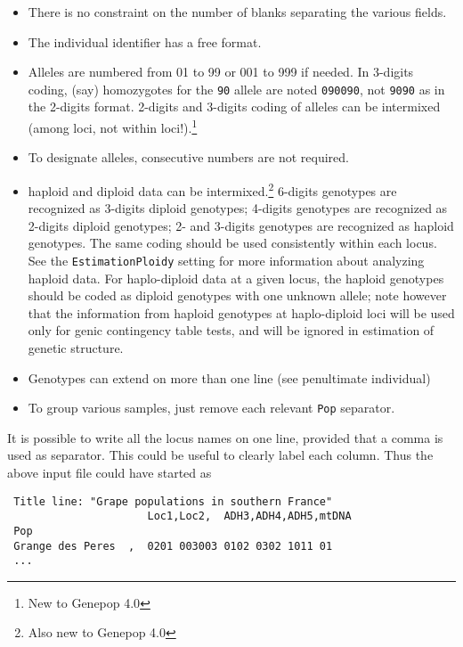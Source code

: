 \documentclass[12pt,]{book}
\let\rmarkdownfootnote\footnote%
\def\footnote{\protect\rmarkdownfootnote}
\begin{document}
\begin{itemize}
\item
  There is no constraint on the number of blanks separating the various
  fields.
\item
  The individual identifier has a free format.
\item
  Alleles are numbered from 01 to 99 or 001 to 999 if needed.
   In 3-digits coding,
   (say) homozygotes for the \texttt{90}
  allele are noted \texttt{090090}, not \texttt{9090} as in the 2-digits
  format. 2-digits and 3-digits coding of alleles can be intermixed
  (among loci, not within loci!).\footnote{New to Genepop 4.0}
\item
  To designate alleles, consecutive numbers are not required.
\item
  haploid and diploid data can be
  intermixed.\footnote{Also new to Genepop 4.0} 6-digits genotypes are
  recognized as 3-digits diploid
  genotypes; 4-digits genotypes are
  recognized as 2-digits diploid
  genotypes; 2- and 3-digits genotypes are
  recognized as haploid genotypes. The same coding
  should be used consistently within each locus. See the
  \texttt{EstimationPloidy} setting for more information about analyzing
  haploid data. For haplo-diploid data at
  a given locus, the haploid genotypes should be coded as diploid
  genotypes with one unknown allele; note however that the information
  from haploid genotypes at haplo-diploid loci will be used only for
  genic contingency table tests, and will be ignored in estimation of
  genetic structure.
\item
  Genotypes can extend on more than one line (see penultimate
  individual)
\item
  To group various samples, just remove each relevant \texttt{Pop}
  separator.
\end{itemize}

It is possible to write all the locus names on one line, provided that a
comma is used as separator. This could be useful to clearly label each
column. Thus the above input file could have started as

\begin{verbatim}
 Title line: "Grape populations in southern France"
                      Loc1,Loc2,  ADH3,ADH4,ADH5,mtDNA
 Pop
 Grange des Peres  ,  0201 003003 0102 0302 1011 01
 ...
\end{verbatim}
\end{document}
